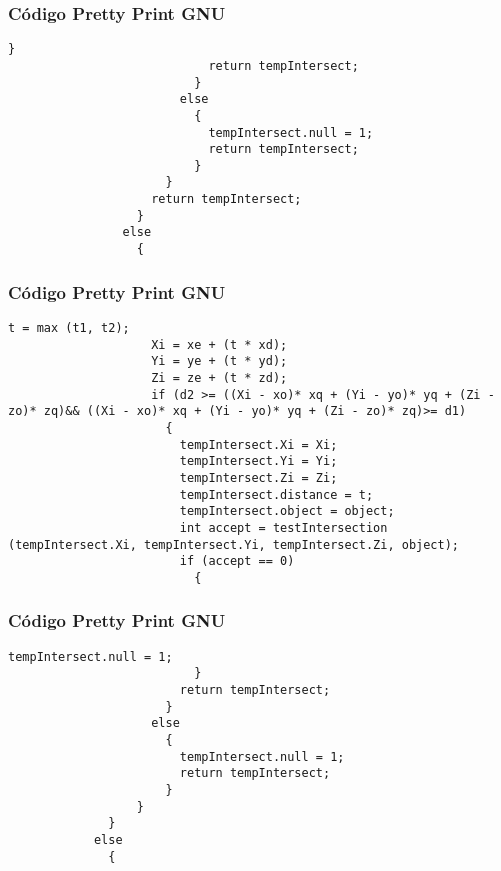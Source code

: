 \documentclass{beamer}
\begin{document}
\begin{frame}[fragile]
\frametitle{C\'odigo Pretty Print GNU}
\begin{lstlisting}[style=CStyle]
                              }
                            return tempIntersect;
                          }
                        else
                          {
                            tempIntersect.null = 1;
                            return tempIntersect;
                          }
                      }
                    return tempIntersect;
                  }
                else
                  {
                    \end{lstlisting}
\end{frame}
\begin{frame}[fragile]
\frametitle{C\'odigo Pretty Print GNU}
\begin{lstlisting}[style=CStyle]
                    t = max (t1, t2);
                    Xi = xe + (t * xd);
                    Yi = ye + (t * yd);
                    Zi = ze + (t * zd);
                    if (d2 >= ((Xi - xo)* xq + (Yi - yo)* yq + (Zi - zo)* zq)&& ((Xi - xo)* xq + (Yi - yo)* yq + (Zi - zo)* zq)>= d1)
                      {
                        tempIntersect.Xi = Xi;
                        tempIntersect.Yi = Yi;
                        tempIntersect.Zi = Zi;
                        tempIntersect.distance = t;
                        tempIntersect.object = object;
                        int accept = testIntersection (tempIntersect.Xi, tempIntersect.Yi, tempIntersect.Zi, object);
                        if (accept == 0)
                          {
                            \end{lstlisting}
\end{frame}
\begin{frame}[fragile]
\frametitle{C\'odigo Pretty Print GNU}
\begin{lstlisting}[style=CStyle]
                            tempIntersect.null = 1;
                          }
                        return tempIntersect;
                      }
                    else
                      {
                        tempIntersect.null = 1;
                        return tempIntersect;
                      }
                  }
              }
            else
              {
                \end{lstlisting}
\end{frame}
\end{document}
